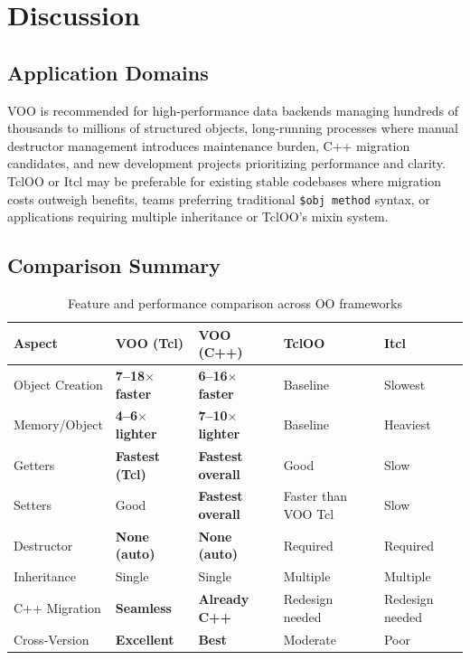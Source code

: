 \section{Discussion}

\subsection{Application Domains}

VOO is recommended for high-performance data backends managing hundreds of thousands to
millions of structured objects, long-running processes where manual destructor management
introduces maintenance burden, C++ migration candidates, and new development projects
prioritizing performance and clarity. TclOO or Itcl may be preferable for existing stable
codebases where migration costs outweigh benefits, teams preferring traditional
\texttt{\$obj method} syntax, or applications requiring multiple inheritance or TclOO's
mixin system.

\subsection{Comparison Summary}

\begin{table}[H]
\centering
\caption{Feature and performance comparison across OO frameworks}
\begin{tabular}{L{3.2cm}L{2.5cm}L{2.5cm}L{2.2cm}L{2.2cm}}
\toprule
\textbf{Aspect} & \textbf{VOO (Tcl)} & \textbf{VOO (C++)} & \textbf{TclOO} & \textbf{Itcl} \\
\midrule
Object Creation   & \textbf{7--18$\times$ faster} & \textbf{6--16$\times$ faster} & Baseline & Slowest \\
Memory/Object     & \textbf{4--6$\times$ lighter} & \textbf{7--10$\times$ lighter} & Baseline & Heaviest \\
Getters           & \textbf{Fastest (Tcl)} & \textbf{Fastest overall} & Good & Slow \\
Setters           & Good & \textbf{Fastest overall} & Faster than VOO Tcl & Slow \\
Destructor        & \textbf{None (auto)} & \textbf{None (auto)} & Required & Required \\
Inheritance       & Single & Single & Multiple & Multiple \\
C++ Migration     & \textbf{Seamless} & \textbf{Already C++} & Redesign needed & Redesign needed \\
Cross-Version     & \textbf{Excellent} & \textbf{Best} & Moderate & Poor \\
\bottomrule
\end{tabular}
\end{table}

